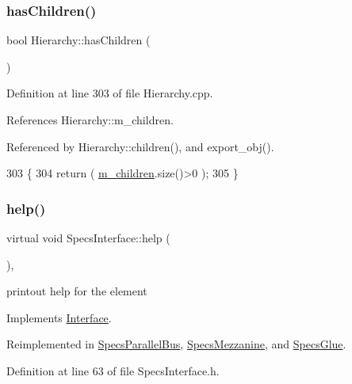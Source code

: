 \subsubsection{\texorpdfstring{has\+Children()}{hasChildren()}}
{\footnotesize\ttfamily bool Hierarchy\+::has\+Children (\begin{DoxyParamCaption}{ }\end{DoxyParamCaption})\hspace{0.3cm}{\ttfamily [inherited]}}



Definition at line 303 of file Hierarchy.\+cpp.



References Hierarchy\+::m\+\_\+children.



Referenced by Hierarchy\+::children(), and export\+\_\+obj().


\begin{DoxyCode}
303                               \{
304   \textcolor{keywordflow}{return} ( \hyperlink{classHierarchy_a038816763941fd4a930504917f60483b}{m\_children}.size()>0 );
305 \}
\end{DoxyCode}
\mbox{\label{classSpecsInterface_a24bf2b5e2da6c675ba5de3b226481a73}} 
\subsubsection{\texorpdfstring{help()}{help()}}
{\footnotesize\ttfamily virtual void Specs\+Interface\+::help (\begin{DoxyParamCaption}{ }\end{DoxyParamCaption})\hspace{0.3cm}{\ttfamily [inline]}, {\ttfamily [virtual]}}

printout help for the element 

Implements \hyperlink{classInterface_aedd3cf1d964c837e7848ccf81dc9c760}{Interface}.



Reimplemented in \hyperlink{classSpecsParallelBus_a67b05d066de051d33a6afff267f9178e}{Specs\+Parallel\+Bus}, \hyperlink{classSpecsMezzanine_a9cbb99c91d987194009be1cb81d2ba7c}{Specs\+Mezzanine}, and \hyperlink{classSpecsGlue_a04fd0c122ac6980833fd87af92377791}{Specs\+Glue}.



Definition at line 63 of file Specs\+Interface.\+h.



